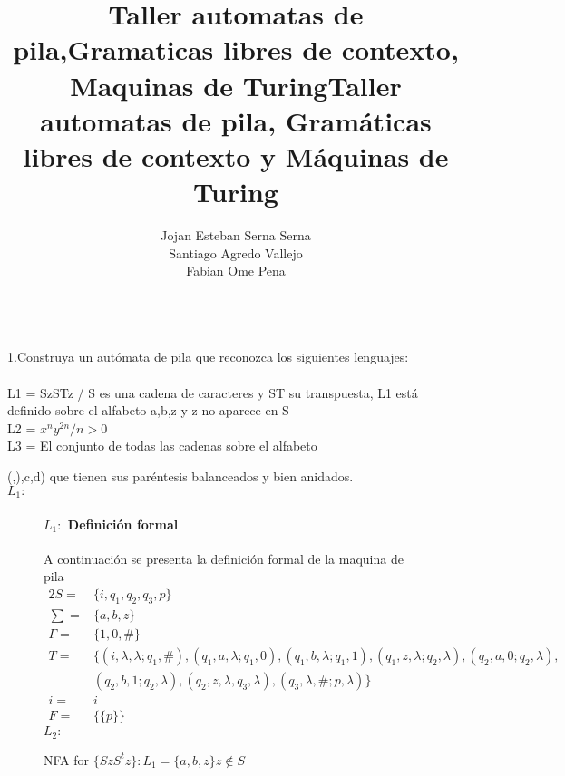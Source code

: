 \documentclass[10pt,a4paper]{book}
\date{}
\title{\Huge Taller automatas de pila,Gramaticas libres de contexto, Maquinas de Turing}
\author{Jojan Esteban Serna Serna\\Santiago Agredo Vallejo\\Fabian Ome Pena}
\begin{document}
	\maketitle
	\title{\huge Taller automatas de pila, Gramáticas libres de contexto y Máquinas de Turing}\\[2cm]
	1.Construya un autómata de pila que reconozca los siguientes lenguajes:\\ \\
	L1 = { SzSTz / S es una cadena de caracteres y ST su transpuesta},  L1 está definido sobre el alfabeto {a,b,z} y z no aparece en S\\
	L2 = ${ x^ny^{2n} / n>0}$\\
	L3 = El conjunto de todas las cadenas sobre el alfabeto {(,),c,d) que tienen sus paréntesis balanceados y bien anidados.\\
	\textbf{$L_1:$}
		\begin{figure*}[ht]
		\caption{NFA for $\{SzS^tz \} : L_1 = \{a,b,z\} z \notin S$}
\paragraph{$L_1:$ Definición formal}A continuación se presenta la definición formal de la maquina de pila\\[0.2cm]
\begin{alignat*}{2}
	S=& \{i, q_1, q_2, q_3, p\}\\
	\textstyle \sum=& \{a, b, z\}\\
	\Gamma=&\{1,0,\#\}\\
	T=&\{(i,\lambda,\lambda;q_1,\#),(q_1,a,\lambda;q_1,0),(q_1,b,\lambda;q_1,1),(q_1,z,\lambda;q_2,\lambda) ,(q_2,a,0;q_2,\lambda),\\&(q_2,b,1;q_2,\lambda),(q_2,z,\lambda,q_3,\lambda),(q_3,\lambda,\#;p,\lambda)    \}\\
	i=&i\\
	F=&\{\{p\}\}
\end{alignat*}
\newpage
\textbf{$L_2:$}
	\end{figure*}

}
\end{document}

